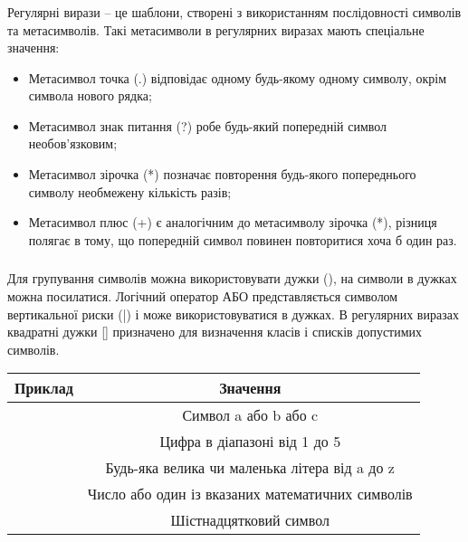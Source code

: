 \documentclass[t]{beamer}  %
\begin{document}
\begin{frame}
  \frametitle{\insertsection} 
	\framesubtitle{\insertsubsection}
	Регулярні вирази -- це шаблони, створені з використанням послідовності символів та метасимволів. Такі метасимволи в регулярних виразах мають спеціальне значення:  
\begin{itemize}
	  \item Метасимвол точка (.) відповідає одному будь-якому одному символу, окрім символа нового рядка;
	  \item Метасимвол знак питання (?) робе будь-який попередній символ необов'язковим;
	  \item Метасимвол зірочка (*) позначає повторення будь-якого попереднього символу необмежену кількість разів;
	  \item Метасимвол плюс (+) є аналогічним до метасимволу зірочка (*), різниця полягає в тому, що попередній символ повинен повторитися хоча б один раз.
\end{itemize}
	  
\end{frame}

\begin{frame}
  \frametitle{\insertsection} 
	\framesubtitle{\insertsubsection}
	Для групування символів можна використовувати дужки (), на символи в дужках можна посилатися. Логічний оператор АБО представляється символом вертикальної риски (|) і може використовуватися в дужках.
	В регулярних виразах квадратні дужки [] призначено для визначення класів і списків допустимих  символів.
	\begin{table}
	  \label{tab:}
	
	  \begin{center}
	    \begin{tabular}{|c|c|}
	    \hline
	      {\bf Приклад} & {\bf Значення} \\
	       \hline
	       [abc] & Символ a або b або c\\
	       \hline
	       [1-5] & Цифра в діапазоні від 1 до 5\\
	       \hline
	       [a-zA-Z] & Будь-яка велика чи маленька літера від a до z\\
	       \hline
	       [0-9+-*/] & Число або один із вказаних математичних символів\\
	       \hline
	       [0-9a-fA-F] & Шістнадцятковий символ\\
	       \hline
	    \end{tabular}
	  \end{center}
	\end{table}
\end{frame}
\end{document}
